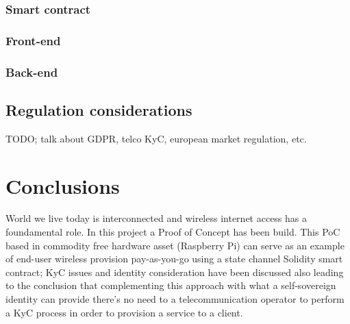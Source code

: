 \documentclass[12pt]{amsart}
\begin{document}
\begin{multicols}{2}


\vspace{0.35cm}

\subsubsection{Smart contract}
\subsubsection{Front-end} \label{ch:front-end}
\subsubsection{Back-end} \label{ch:back-end}





\subsection{Regulation considerations} \label{ch:regulation}

\vspace{0.35cm}

TODO; talk about GDPR, telco KyC, european market regulation, etc.

\section{Conclusions}\label{sec:conclusions}

\vspace{0.35cm}

World we live today is interconnected and wireless
internet access has a foundamental role. In this project
a Proof of Concept has been build. This PoC based in
commodity free hardware asset (Raspberry Pi) can serve
as an example of end-user wireless provision pay-as-you-go
using a state channel Solidity smart contract; KyC issues
and identity consideration have been discussed also leading
to the conclusion that complementing this approach with
what a self-sovereign identity can provide there's no need
to a telecommunication operator to perform a KyC process
in order to provision a service to a client.


\end{multicols}
\end{document}
